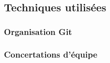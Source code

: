 \subsection{Techniques utilisées}
\label{sub:Techniques utilisées}
\subsubsection{Organisation Git}
\label{subs:Organisation Git}

\subsubsection{Concertations d'équipe}
\label{subs:Concertations d'équipe}

